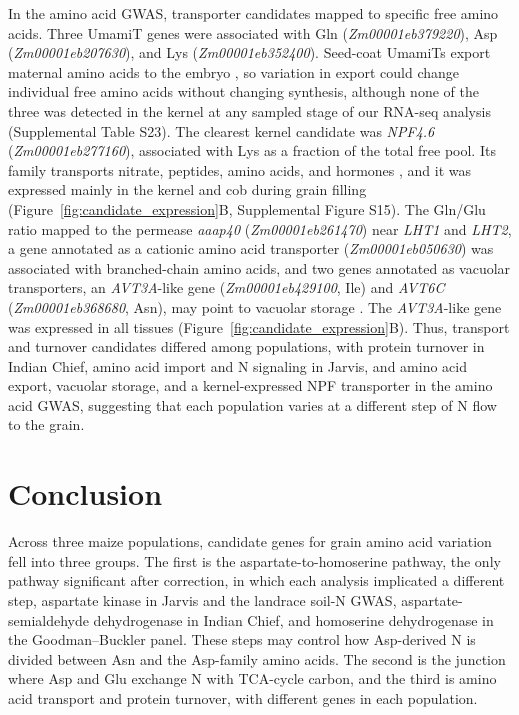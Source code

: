 \documentclass[namedate,unnumsec,webpdf,contemporary,large]{oup-authoring-template}
\begin{document}
In the amino acid GWAS, transporter candidates mapped to specific free amino acids. Three UmamiT genes were associated with Gln (\textit{Zm00001eb379220}), Asp (\textit{Zm00001eb207630}), and Lys (\textit{Zm00001eb352400}). Seed-coat UmamiTs export maternal amino acids to the embryo \citep{Muller2015UmamiT}, so variation in export could change individual free amino acids without changing synthesis, although none of the three was detected in the kernel at any sampled stage of our RNA-seq analysis (Supplemental Table S23). The clearest kernel candidate was \textit{NPF4.6} (\textit{Zm00001eb277160}), associated with Lys as a fraction of the total free pool. Its family transports nitrate, peptides, amino acids, and hormones \citep{Leran2014NPF}, and it was expressed mainly in the kernel and cob during grain filling (Figure~\ref{fig:candidate_expression}B, Supplemental Figure S15). The Gln/Glu ratio mapped to the permease \textit{aaap40} (\textit{Zm00001eb261470}) near \textit{LHT1} and \textit{LHT2}, a gene annotated as a cationic amino acid transporter (\textit{Zm00001eb050630}) was associated with branched-chain amino acids, and two genes annotated as vacuolar transporters, an \textit{AVT3A}-like gene (\textit{Zm00001eb429100}, Ile) and \textit{AVT6C} (\textit{Zm00001eb368680}, Asn), may point to vacuolar storage \citep{Fujiki2017AtAVT3}. The \textit{AVT3A}-like gene was expressed in all tissues (Figure~\ref{fig:candidate_expression}B). Thus, transport and turnover candidates differed among populations, with protein turnover in Indian Chief, amino acid import and N signaling in Jarvis, and amino acid export, vacuolar storage, and a kernel-expressed NPF transporter in the amino acid GWAS, suggesting that each population varies at a different step of N flow to the grain.

\section{Conclusion}

Across three maize populations, candidate genes for grain amino acid variation fell into three groups. The first is the aspartate-to-homoserine pathway, the only pathway significant after correction, in which each analysis implicated a different step, aspartate kinase in Jarvis and the landrace soil-N GWAS, aspartate-semialdehyde dehydrogenase in Indian Chief, and homoserine dehydrogenase in the Goodman--Buckler panel. These steps may control how Asp-derived N is divided between Asn and the Asp-family amino acids. The second is the junction where Asp and Glu exchange N with TCA-cycle carbon, and the third is amino acid transport and protein turnover, with different genes in each population.
\end{document}
